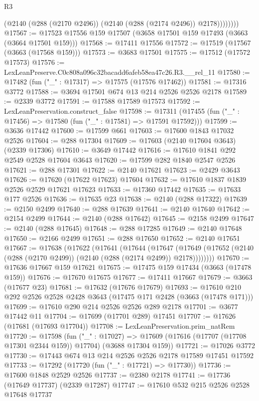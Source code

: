 \begin{lexlean}{R3}
\begin{coremodule}
                (@2140 (@288 (@2170 @2496)) (@2140 (@288 (@2174 @2496)) @2178))))))))
@17567 := @17523 @17556 @159 @17507 (@3658 @17501 @159 @17493 (@3663 (@3664 @17501 @159)))
@17568 := @17411 @17556
@17572 := @17519 (@17567 (@3663 (@17568 @159)))
@17573 := @3683 @17501
@17575 := @17512 (@17572 @17573)
@17576 := LexLeanPreserve.C0c808a096c32bacadd6afeb58ea47c26.R3.__rel_11
@17580 := @17482 (fun ("_" : @17317) => @17575 (@17576 @17462))
@17581 := @17316 @3772
@17588 := @3694 @17501 @674 @13 @214 @2526 @2526 @2178
@17589 := @2339 @3772
@17591 := @17588 @17589 @17573
@17592 := LexLeanPreservation.construct_false
@17598 := @17311 (@17455 (fun ("_" : @17456) => @17580 (fun ("_" : @17581) => @17591 @17592)))
@17599 := @3636 @17442
@17600 := @17599 @661
@17603 := @17600 @1843 @17032 @2526
@17604 := @288 @17304
@17609 := @17603 (@2140 @17604 @3643) (@2339 @17306)
@17610 := @3649 @17442
@17616 := @17610 @1841 @292 @2549 @2528 @17604 @3643
@17620 := @17599 @282 @1840 @2547 @2526
@17621 := @288 @17301
@17622 := @2140 @17621
@17623 := @2429 @3643
@17626 := @17620 (@17622 @17623) @17604
@17632 := @17610 @1837 @1839 @2526 @2529 @17621 @17623
@17633 := @17360 @17442
@17635 := @17633 @177 @2526
@17636 := @17635 @23
@17638 := @2140 (@288 @17322)
@17639 := @2150 @2499
@17640 := @288 @17639
@17641 := @2140 @17640
@17642 := @2154 @2499
@17644 := @2140 (@288 @17642)
@17645 := @2158 @2499
@17647 := @2140 (@288 @17645)
@17648 := @288 @17285
@17649 := @2140 @17648
@17650 := @2166 @2499
@17651 := @288 @17650
@17652 := @2140 @17651
@17667 := @17638
    (@17622
      (@17641
        (@17644
          (@17647
            (@17649 (@17652 (@2140 (@288 (@2170 @2499)) (@2140 (@288 (@2174 @2499)) @2178))))))))
@17670 := @17636 @17667 @159 @17621
@17675 := @17475 @159 @17434 (@3663 (@17478 @159))
@17676 := @17670 @17675
@17677 := @17411 @17667
@17679 := @3663 (@17677 @23)
@17681 := @17632 (@17676 @17679)
@17693 := @17610 @210 @292 @2526 @2528 @2428 @3643 (@17475 @171 @2428 (@3663 (@17478 @171)))
@17699 := @17610 @290 @214 @2526 @2526 @289 @2178
@17701 := @3677 @17442 @11
@17704 := @17699 (@17701 @289) @17451
@17707 := @17626 (@17681 (@17693 @17704))
@17708 := LexLeanPreservation.prim_natRem
@17720 := @17598
    (fun ("_" : @17027) =>
    @17609 (@17616 (@17707 (@17708 @17301 @2344 @159)) @17704) (@3688 @17304 @159))
@17721 := @17026 @3772
@17730 := @17443 @674 @13 @214 @2526 @2526 @2178 @17589 @17451 @17592
@17733 := @17292 (@17720 (fun ("_" : @17721) => @17730))
@17736 := @17600 @1848 @2529 @2526
@17737 := @2380 @2178
@17741 := @17736 (@17649 @17737) (@2339 @17287)
@17747 := @17610 @532 @215 @2526 @2528 @17648 @17737

\end{coremodule}
\end{lexlean}
